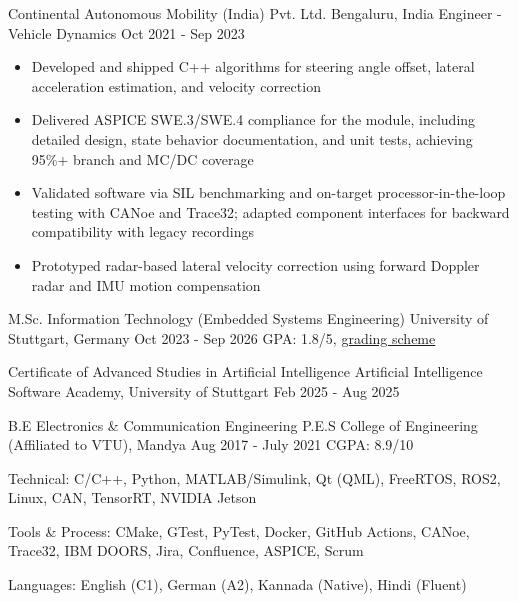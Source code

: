 \documentclass{bmsnkresume}
\begin{document}
\experience
  {Continental Autonomous Mobility (India) Pvt. Ltd.}
  {Bengaluru, India}
  {Engineer - Vehicle Dynamics}
  {Oct 2021 - Sep 2023}
\begin{itemize}
  \item Developed and shipped C++ algorithms for steering angle offset, lateral acceleration estimation, and velocity correction
  \item Delivered ASPICE SWE.3/SWE.4 compliance for the module, including detailed design, state behavior documentation, and unit tests, achieving 95\%+ branch and MC/DC coverage
  \item Validated software via SIL benchmarking and on-target processor-in-the-loop testing with CANoe and Trace32; adapted component interfaces for backward compatibility with legacy recordings
  \item Prototyped radar-based lateral velocity correction using forward Doppler radar and IMU motion compensation
\end{itemize}
\vspace{-0.33em}

  \educationentry
    {M.Sc. Information Technology (Embedded Systems Engineering)}
    {University of Stuttgart, Germany}
    {Oct 2023 - Sep 2026}
    {GPA: 1.8/5, {\footnotesize\href{https://www.infotech.uni-stuttgart.de/program/reg19/}{grading scheme}}}
    {}

  \educationentry
    {Certificate of Advanced Studies in Artificial Intelligence}
    {Artificial Intelligence Software Academy, University of Stuttgart}
    {Feb 2025 - Aug 2025}
    {}
    {}

  \educationentry
    {B.E Electronics \& Communication Engineering}
    {P.E.S College of Engineering (Affiliated to VTU), Mandya}
    {Aug 2017 - July 2021}
    {CGPA: 8.9/10}
    {}

\vspace{-0.05em}
\vspace{0.2em}

{\color{darktext} Technical: C/C++, Python, MATLAB/Simulink, Qt (QML), FreeRTOS, ROS2, Linux, CAN, TensorRT, NVIDIA Jetson\par}
{\color{darktext} Tools \& Process: CMake, GTest, PyTest, Docker, GitHub Actions, CANoe, Trace32, IBM DOORS, Jira, Confluence, ASPICE, Scrum\par}
{\color{darktext} Languages: English (C1), German (A2), Kannada (Native), Hindi (Fluent)\par}
\end{document}

